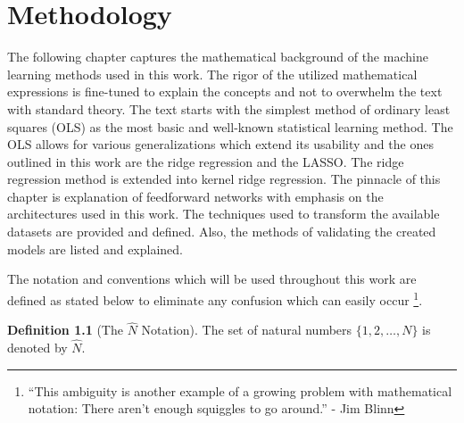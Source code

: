 \documentclass[11pt,oneside,czech,american]{book} %
\theoremstyle{definition} %
\theoremstyle{definition}
\newtheorem{defn}{Definition}
\begin{document}
\chapter{Methodology}
\pagestyle{headings}
The following chapter captures the mathematical background of the machine learning methods used in this work. The rigor of the utilized mathematical expressions is fine-tuned to explain the concepts and not to overwhelm the text with standard theory. The text starts with the simplest method of ordinary least squares (OLS) as the most basic and well-known statistical learning method. The OLS allows for various generalizations which extend its usability and the ones outlined in this work are the ridge regression and the LASSO. The ridge regression method is extended into kernel ridge regression. The pinnacle of this chapter is explanation of feedforward networks with emphasis on the architectures used in this work. The techniques used to transform the available datasets are provided and defined. Also, the methods of validating the created models are listed and explained.

The notation and conventions which will be used throughout this work are defined as stated below to eliminate any confusion which can easily occur \footnote{“This ambiguity is another example of a growing problem with mathematical notation: There aren't enough squiggles to go around.” - Jim Blinn}.

\begin{defn}[{The $\hat{N}$ Notation}]
	The set of natural numbers $\{1, 2, \dots, N\}$ is denoted by $\hat{N}$.
\end{defn}
\end{document}
